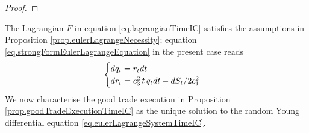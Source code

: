 \documentclass[10pt,a4paper]{article}
\begin{document}
\begin{proof}
%		
%		
\end{proof}

The Lagrangian $F$ in equation \eqref{eq.lagrangianTimeIC} satisfies the assumptions in Proposition \ref{prop.eulerLagrangeNecessity}; equation \eqref{eq.strongFormEulerLagrangeEquation} in the present case reads
\begin{equation}\label{eq.eulerLagrangeSystemTimeIC}
\begin{cases}
dq_t=r_{t} dt \\
dr_{t} = c_{3}^{2} \, t \, q_t dt - dS_t / 2c_{1}^{2}
\end{cases}
\end{equation}
We now characterise the good trade execution in Proposition \ref{prop.goodTradeExecutionTimeIC} as the unique solution to the random Young differential equation \eqref{eq.eulerLagrangeSystemTimeIC}.
\end{document}
